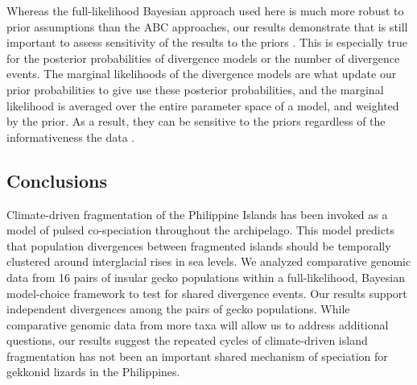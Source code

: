 Whereas the full-likelihood Bayesian approach used here is much more robust to
prior assumptions than the ABC approaches, our results demonstrate that is
still important to assess sensitivity of the results to the priors
\citep{Oaks2012}.
This is especially true for the posterior probabilities of divergence models or
the number of divergence events.
The marginal likelihoods of the divergence models are what update our prior
probabilities to give use these posterior probabilities, and the marginal
likelihood is averaged over the entire parameter space of a model, and weighted
by the prior.
As a result, they can be sensitive to the priors regardless of the
informativeness the data \citep{Oaks2018marginal}.

\subsection{Conclusions}
Climate-driven fragmentation of the Philippine Islands has been invoked as a
model of pulsed co-speciation throughout the archipelago.
This model predicts that population divergences between fragmented islands
should be temporally clustered around interglacial rises in sea levels.
We analyzed comparative genomic data from 16 pairs of insular gecko populations
within a full-likelihood, Bayesian model-choice framework to test for shared
divergence events.
Our results support independent divergences among the pairs of gecko
populations.
While comparative genomic data from more taxa will allow us to address
additional questions, our results suggest the repeated cycles of climate-driven
island fragmentation has not been an important shared mechanism of speciation
for gekkonid lizards in the Philippines.
